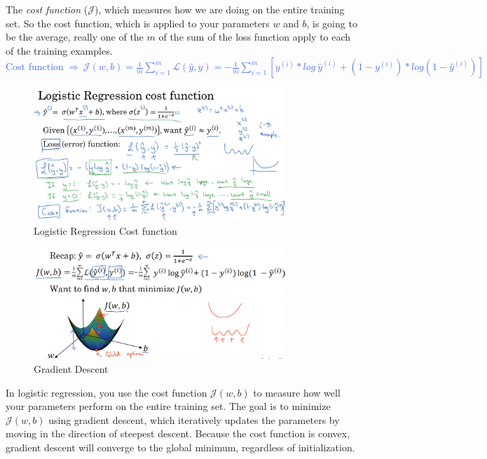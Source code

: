 \documentclass[letterpaper,12pt,notitlepage,twoside]{report}
\begin{document}
The \emph{cost function} ($\mathcal{J}$), which measures how we are doing on the entire training set. So the cost function, which is applied to your parameters $w$ and $b$, is going to be the average, really one of the $m$ of the sum of the loss function apply to each of the training examples.  \\
\textcolor{RoyalBlue}{$\text{Cost function}~  \Rightarrow~ \mathcal{J}(w, b) = \frac{1}{m} \sum_{i=1}^m \mathcal{L}(\hat{y}, y) = - \frac{1}{m}  \sum_{i=1}^m[y^{(i)}*log~\hat{y}^{(i)} + (1 - y^{(i)})*log(1 - \hat{y}^{(i)})]$}

\begin{figure}[h]
	\centering
	\includegraphics[width=0.85\textwidth]{Images/Cost function.png}
	\caption{Logistic Regression Cost function}
	\label{fig:8}
\end{figure}
\FloatBarrier

\begin{figure}[h]
	\centering
	\includegraphics[width=0.85\textwidth]{Images/Gradient descent plot.png}
	\caption{Gradient Descent}
	\label{fig:9}
\end{figure}
\FloatBarrier

In logistic regression, you use the cost function $\mathcal{J}(w, b)$ to measure how well your parameters perform on the entire training set. The goal is to minimize $ \mathcal{J}(w, b)$ using gradient descent, which iteratively updates the parameters by moving in the direction of steepest descent. Because the cost function is convex, gradient descent will converge to the global minimum, regardless of initialization.
\end{document}
